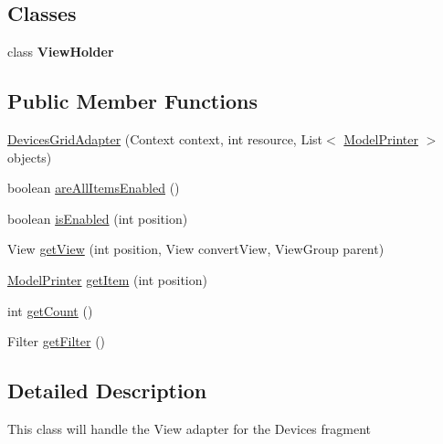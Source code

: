 \subsection*{Classes}
\begin{DoxyCompactItemize}
\item 
class {\bfseries View\+Holder}
\end{DoxyCompactItemize}
\subsection*{Public Member Functions}
\begin{DoxyCompactItemize}
\item 
\hyperlink{classandroid_1_1app_1_1printerapp_1_1devices_1_1_devices_grid_adapter_a8b53fc01a762e9f93fc2d7fa77f1fd56}{Devices\+Grid\+Adapter} (Context context, int resource, List$<$ \hyperlink{classandroid_1_1app_1_1printerapp_1_1model_1_1_model_printer}{Model\+Printer} $>$ objects)
\item 
boolean \hyperlink{classandroid_1_1app_1_1printerapp_1_1devices_1_1_devices_grid_adapter_ab7b2ddd35f74616bff124643166512a2}{are\+All\+Items\+Enabled} ()
\item 
boolean \hyperlink{classandroid_1_1app_1_1printerapp_1_1devices_1_1_devices_grid_adapter_a618aad1e65340b79de6ad9dbf722888b}{is\+Enabled} (int position)
\item 
View \hyperlink{classandroid_1_1app_1_1printerapp_1_1devices_1_1_devices_grid_adapter_a60ef27be443bdf9c0960ce202fedcb5f}{get\+View} (int position, View convert\+View, View\+Group parent)
\item 
\hyperlink{classandroid_1_1app_1_1printerapp_1_1model_1_1_model_printer}{Model\+Printer} \hyperlink{classandroid_1_1app_1_1printerapp_1_1devices_1_1_devices_grid_adapter_a1f0fbc9a80c4d972a4f378c54c71f817}{get\+Item} (int position)
\item 
int \hyperlink{classandroid_1_1app_1_1printerapp_1_1devices_1_1_devices_grid_adapter_a154e8089ebd77e2514ae62e5453c0c04}{get\+Count} ()
\item 
Filter \hyperlink{classandroid_1_1app_1_1printerapp_1_1devices_1_1_devices_grid_adapter_abed252db7f88bde7aad813f9aeaef628}{get\+Filter} ()
\end{DoxyCompactItemize}


\subsection{Detailed Description}
This class will handle the View adapter for the Devices fragment

